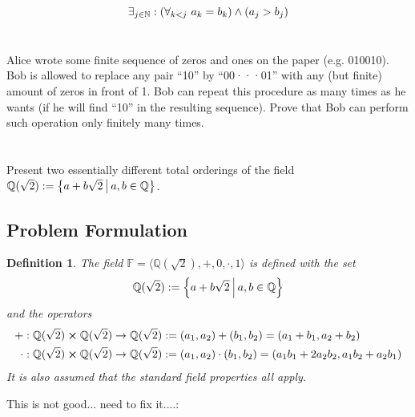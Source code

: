 \documentclass[]{article}
\newcommand{\N}{\mathbb{N}}
\newcommand{\Q}{\mathbb{Q}}
\newcommand{\st}{ \ \vline \ }
\newtheorem{definition}{Definition}
\begin{document}
$$\exists_{j\in\N} : \qty(\forall_{k < j} \ a_k = b_k) \land (a_j > b_j)$$










\newpage
\section{}
Alice wrote some finite sequence of zeros and ones on the paper (e.g. 010010). 
Bob is allowed to replace any pair ``10'' by ``00···01'' with any (but finite) 
amount of zeros in front of 1. Bob can repeat this procedure as many times as 
he wants (if he will find ``10'' in the resulting sequence). 
Prove that Bob can perform such operation only finitely many times.













\newpage
\section{}
Present two essentially different total orderings of the field 
$\Q(\sqrt{2}) := \qty{a + b \sqrt{2} \st a,b \in \Q}$.
\subsection*{Problem Formulation}
\begin{definition}
    The field $\mathbb{F} = \langle\Q(\sqrt{2}),+,0,\cdot,1\rangle$ is defined with the set
    $$\Q(\sqrt{2}) := \qty{a + b \sqrt{2} \st a,b \in \Q}$$
    and the operators
    \begin{align*}
        + : \Q(\sqrt{2}) \cross \Q(\sqrt{2}) \to \Q(\sqrt{2}) 
            &:= (a_1,a_2) + (b_1,b_2) = (a_1 + b_1, a_2 + b_2)\\
        \cdot : \Q(\sqrt{2}) \cross \Q(\sqrt{2}) \to \Q(\sqrt{2}) 
            &:= (a_1,a_2) \cdot (b_1,b_2) = (a_1 b_1 + 2 a_2 b_2, a_1 b_2 + a_2 b_1)
    \end{align*}
    It is also assumed that the standard field properties all apply.
\end{definition}


This is not good... need to fix it....:
\end{document}
